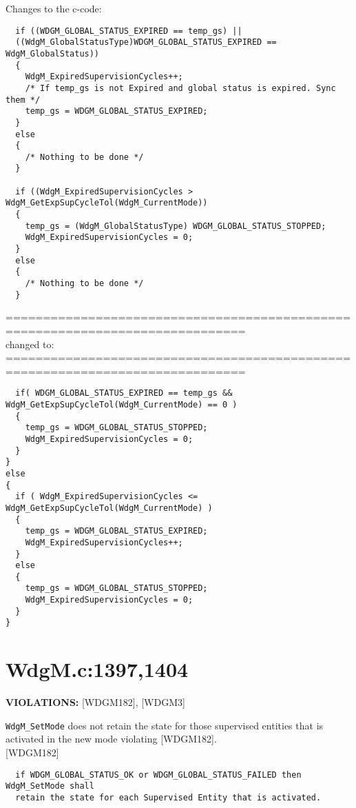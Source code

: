 \documentclass[11pt,a4paper]{article}
\begin{document}
Changes to the c-code:
\begin{lstlisting}
  if ((WDGM_GLOBAL_STATUS_EXPIRED == temp_gs) ||
  ((WdgM_GlobalStatusType)WDGM_GLOBAL_STATUS_EXPIRED == WdgM_GlobalStatus))
  {
    WdgM_ExpiredSupervisionCycles++;
    /* If temp_gs is not Expired and global status is expired. Sync them */
    temp_gs = WDGM_GLOBAL_STATUS_EXPIRED;
  }
  else
  {
    /* Nothing to be done */
  }

  if ((WdgM_ExpiredSupervisionCycles > WdgM_GetExpSupCycleTol(WdgM_CurrentMode))
  {
    temp_gs = (WdgM_GlobalStatusType) WDGM_GLOBAL_STATUS_STOPPED;
    WdgM_ExpiredSupervisionCycles = 0;
  }
  else
  {
    /* Nothing to be done */
  }
\end{lstlisting}
==============================================================================\\
changed to:\\
==============================================================================
\begin{lstlisting}
  if( WDGM_GLOBAL_STATUS_EXPIRED == temp_gs && WdgM_GetExpSupCycleTol(WdgM_CurrentMode) == 0 )
  {
    temp_gs = WDGM_GLOBAL_STATUS_STOPPED;
    WdgM_ExpiredSupervisionCycles = 0;
  }
}
else
{
  if ( WdgM_ExpiredSupervisionCycles <= WdgM_GetExpSupCycleTol(WdgM_CurrentMode) )
  {
    temp_gs = WDGM_GLOBAL_STATUS_EXPIRED;
    WdgM_ExpiredSupervisionCycles++;
  }
  else
  {
    temp_gs = WDGM_GLOBAL_STATUS_STOPPED;
    WdgM_ExpiredSupervisionCycles = 0;
  }
}
\end{lstlisting}
\newpage

\section{WdgM.c:1397,1404}
\textbf{VIOLATIONS:} [WDGM182], [WDGM3]\\[0.5cm]

\lstset{language=autosar}

\lstinline!WdgM_SetMode! does not retain the state for those supervised entities
that is activated in the new mode violating [WDGM182].\\

[WDGM182]
\begin{lstlisting}
  if WDGM_GLOBAL_STATUS_OK or WDGM_GLOBAL_STATUS_FAILED then WdgM_SetMode shall
  retain the state for each Supervised Entity that is activated.
\end{lstlisting}~\\
\end{document}
